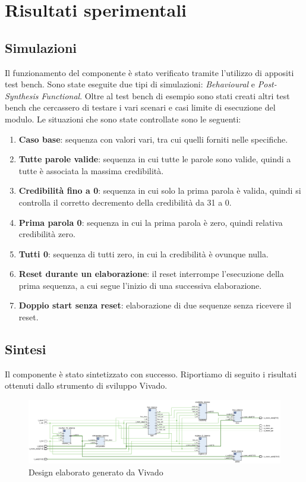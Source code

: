 \section{Risultati sperimentali}

\subsection{Simulazioni}
Il funzionamento del componente è stato verificato tramite l'utilizzo di appositi test bench. Sono state eseguite due tipi di simulazioni: \textit{Behavioural} e \textit{Post-Synthesis Functional}.\newline
Oltre al test bench di esempio sono stati creati altri test bench che cercassero di testare i vari scenari e casi limite di esecuzione del modulo. Le situazioni che sono state controllate sono le seguenti:
\begin{enumerate}
	\item \textbf{Caso base}: sequenza con valori vari, tra cui quelli forniti nelle specifiche.
        \item \textbf{Tutte parole valide}: sequenza in cui tutte le parole sono valide, quindi a tutte è associata la massima credibilità.
        \item \textbf{Credibilità fino a 0}: sequenza in cui solo la prima parola è valida, quindi si controlla il corretto decremento della credibilità da 31 a 0.
        \item \textbf{Prima parola 0}: sequenza in cui la prima parola è zero, quindi relativa credibilità zero.
        \item \textbf{Tutti 0}: sequenza di tutti zero, in cui la credibilità è ovunque nulla.
        \item \textbf{Reset durante un elaborazione}: il reset interrompe l'esecuzione della prima sequenza, a cui segue l'inizio di una successiva elaborazione.
        \item \textbf{Doppio start senza reset}: elaborazione di due sequenze senza ricevere il reset.
\end{enumerate}

\subsection{Sintesi}
Il componente è stato sintetizzato con successo. Riportiamo di seguito i risultati ottenuti dallo strumento di sviluppo Vivado.
\begin{figure}[H]
    \centering
    \includegraphics[width=1\textwidth]{figures/schematic.png}
    \caption{Design elaborato generato da Vivado}
    \label{fig:schematic}
\end{figure}

